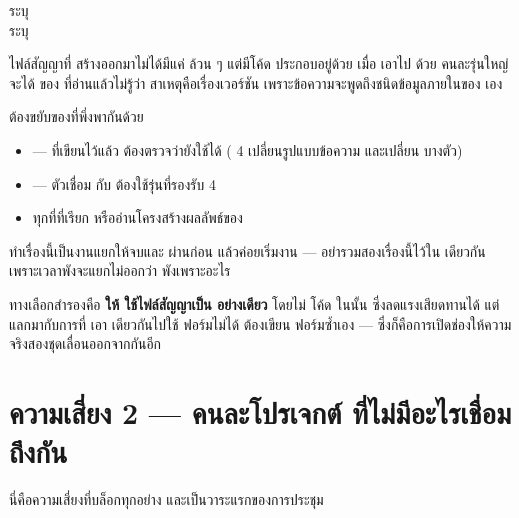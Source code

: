 \begin{goodbox}[title={ตัวเลขจริงจากรีโป}]
 ระบุ  \\
 ระบุ 
\end{goodbox}

ไฟล์สัญญาที่  สร้างออกมาไม่ได้มีแค่  ล้วน ๆ แต่มีโค้ด
 ประกอบอยู่ด้วย เมื่อ  เอาไป  ด้วย
 คนละรุ่นใหญ่ จะได้  ของ  ที่อ่านแล้วไม่รู้ว่า
สาเหตุคือเรื่องเวอร์ชัน เพราะข้อความจะพูดถึงชนิดข้อมูลภายในของ  เอง

\begin{warnbox}[title={การอัป \code{zod} ฝั่ง \en{frontend} ไม่ใช่แค่เปลี่ยนตัวเลข}]
ต้องขยับของที่พึ่งพากันด้วย

\begin{itemize}
\item {} ---  ที่เขียนไว้แล้ว
      ต้องตรวจว่ายังใช้ได้ ( 4 เปลี่ยนรูปแบบข้อความ  และเปลี่ยน
       บางตัว)
\item {} --- ตัวเชื่อม  กับ 
      ต้องใช้รุ่นที่รองรับ  4
\item ทุกที่ที่เรียก  หรืออ่านโครงสร้างผลลัพธ์ของ 
\end{itemize}

ทำเรื่องนี้เป็นงานแยกให้จบและ  ผ่านก่อน แล้วค่อยเริ่มงาน
 --- อย่ารวมสองเรื่องนี้ไว้ใน  เดียวกัน เพราะเวลาพังจะแยกไม่ออกว่า
พังเพราะอะไร
\end{warnbox}

ทางเลือกสำรองคือ \textbf{ให้  ใช้ไฟล์สัญญาเป็น  อย่างเดียว}
โดยไม่  โค้ด  ในนั้น ซึ่งลดแรงเสียดทานได้ แต่แลกมากับการที่
 เอา  เดียวกันไปใช้  ฟอร์มไม่ได้ ต้องเขียน
 ฟอร์มซ้ำเอง --- ซึ่งก็คือการเปิดช่องให้ความจริงสองชุดเลื่อนออกจากกันอีก

\section{ความเสี่ยง 2 --- คนละโปรเจกต์  ที่ไม่มีอะไรเชื่อมถึงกัน}
\label{sec:risk-transport}

นี่คือความเสี่ยงที่บล็อกทุกอย่าง และเป็นวาระแรกของการประชุม

